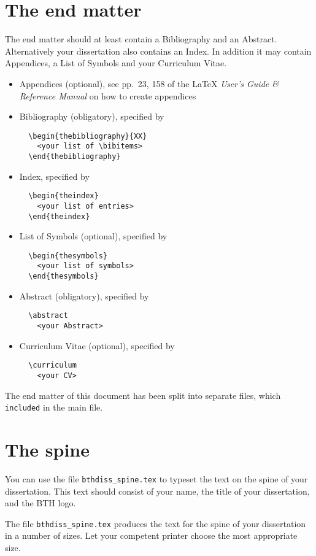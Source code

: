 \section{The end matter}
The end matter should at least contain a Bibliography and an Abstract.
Alternatively your dissertation also contains an Index.
In addition it may contain Appendices, a List of Symbols and your Curriculum Vitae.
\begin{itemize}
\item
Appendices (optional), see pp.\ 23, 158 of the
  \LaTeX{} {\em User's Guide \& Reference Manual\/} on how to create
  appendices 
\item
Bibliography (obligatory), specified by 
\begin{verbatim}
  \begin{thebibliography}{XX}
    <your list of \bibitems>
  \end{thebibliography}
\end{verbatim}
\item
Index, specified by
\begin{verbatim}
  \begin{theindex}
    <your list of entries>
  \end{theindex}
\end{verbatim}
\item
List of Symbols (optional), specified by
\begin{verbatim}
  \begin{thesymbols}
    <your list of symbols>
  \end{thesymbols}
\end{verbatim}
\item
Abstract (obligatory), specified by
\begin{verbatim}
  \abstract
    <your Abstract>
\end{verbatim}
\item
Curriculum Vitae (optional), specified by
\begin{verbatim}
  \curriculum
    <your CV>
\end{verbatim}
\end{itemize}
The end matter of this document has been split into separate files, which \verb|included| in the main file.

\section{The spine}
You can use the file {\tt bthdiss\_spine.tex} to typeset the text on the spine of your dissertation.
This text should consist of your name, the title of your dissertation, and the BTH logo.

The file {\tt bthdiss\_spine.tex} produces the text for the spine of your dissertation in a number of sizes.
Let your competent printer choose the most appropriate size.
